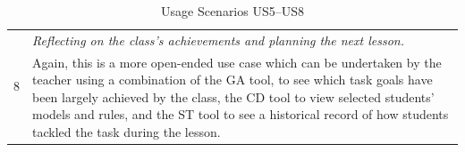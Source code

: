 \begin{table}[htbp]
\begin{tabular}{|p{0.5cm}|p{12.5cm}|}
  \hline \multirow{2}{*}{8}
  & \emph{Reflecting on the class’s achievements and planning the next
  lesson.} \\
  \cline{2-2}
  &  Again, this is a more open-ended use case which can be undertaken by
  the teacher using a combination of the GA tool, to see which task
  goals have been largely achieved by the class, the CD tool to view
  selected students' models and rules, and the ST tool to see a
  historical record of how students tackled the task during the
  lesson.
   \\
  \hline
  \end{tabular}
  \caption{Usage Scenarios US5--US8}
  \label{tab:djdjsdjk1}
\end{table}
 
 

